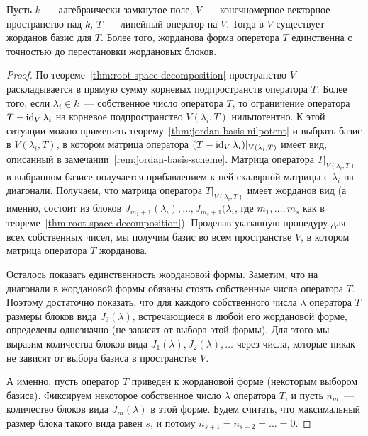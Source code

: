 \begin{theorem}\label{thm:jordan-form}
Пусть $k$~--- алгебраически замкнутое поле, $V$~--- конечномерное векторное
пространство над $k$, $T$~--- линейный оператор на $V$. Тогда
в $V$ существует жорданов базис для $T$. Более того,
жорданова форма оператора $T$ единственна с точностью до перестановки
жордановых блоков.
\end{theorem}
\begin{proof}
По теореме~\ref{thm:root-space-decomposition} пространство $V$ раскладывается
в прямую сумму корневых подпространств оператора $T$. Более того,
если $\lambda_i\in k$~--- собственное число оператора $T$, то ограничение
оператора $T-\operatorname{id}_V\lambda_i$ на корневое подпространство $V(\lambda_i,T)$
нильпотентно. К этой ситуации можно применить
теорему~\ref{thm:jordan-basis-nilpotent} и выбрать базис в
$V(\lambda_i,T)$, в котором матрица оператора
$(T-\operatorname{id}_V\lambda_i)|_{V(\lambda_i,T)}$ имеет вид, описанный
в замечании~\ref{rem:jordan-basis-scheme}.
Матрица оператора $T|_{V(\lambda_i,T)}$ в выбранном базисе
получается прибавлением к ней скалярной матрицы с $\lambda_i$ на диагонали.
Получаем, что матрица оператора $T|_{V(\lambda_i,T)}$
имеет жорданов вид (а именно, состоит из блоков
$J_{m_1+1}(\lambda_i),\dots,J_{m_s+1}(\lambda_i$, где $m_1,\dots,m_s$
как в теореме~\ref{thm:root-space-decomposition}).
Проделав указанную процедуру для всех собственных чисел, мы получим
базис во всем пространстве $V$, в котором матрица оператора $T$
жорданова.

Осталось показать единственность жордановой формы. Заметим, что
на диагонали в жордановой формы обязаны стоять собственные числа
оператора $T$. Поэтому достаточно показать, что для каждого собственного
числа $\lambda$ оператора $T$ размеры блоков вида $J_?(\lambda)$,
встречающиеся в любой его жордановой форме, определены однозначно
(не зависят от выбора этой формы).
Для этого мы выразим количества блоков вида $J_1(\lambda),J_2(\lambda),
\dots$ через числа, которые никак не зависят от выбора базиса
в пространстве $V$.

А именно, пусть оператор $T$ приведен к жордановой форме
(некоторым выбором базиса). Фиксируем некоторое
собственное число $\lambda$ оператора $T$, и
пусть $n_m$~--- количество блоков вида $J_m(\lambda)$ в этой форме.
Будем считать, что максимальный размер блока такого вида
равен $s$, и потому $n_{s+1} = n_{s+2} = \dots = 0$.


\end{proof}
